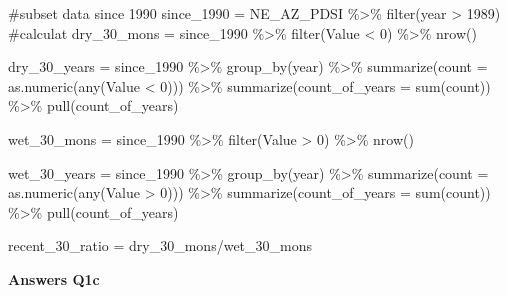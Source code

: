 \documentclass[
  letterpaper,
  DIV=11,
  numbers=noendperiod]{scrartcl}
\newenvironment{Shaded}{\begin{snugshade}}{\end{snugshade}}
\newcommand{\AttributeTok}[1]{\textcolor[rgb]{0.40,0.45,0.13}{#1}}
\newcommand{\CommentTok}[1]{\textcolor[rgb]{0.37,0.37,0.37}{#1}}
\newcommand{\DecValTok}[1]{\textcolor[rgb]{0.68,0.00,0.00}{#1}}
\newcommand{\FunctionTok}[1]{\textcolor[rgb]{0.28,0.35,0.67}{#1}}
\newcommand{\NormalTok}[1]{\textcolor[rgb]{0.00,0.23,0.31}{#1}}
\newcommand{\OtherTok}[1]{\textcolor[rgb]{0.00,0.23,0.31}{#1}}
\newcommand{\SpecialCharTok}[1]{\textcolor[rgb]{0.37,0.37,0.37}{#1}}
\begin{document}
\begin{Shaded}
\begin{Highlighting}[]
\CommentTok{\#subset data since 1990}
\NormalTok{since\_1990 }\OtherTok{=}\NormalTok{ NE\_AZ\_PDSI }\SpecialCharTok{\%\textgreater{}\%} 
  \FunctionTok{filter}\NormalTok{(year }\SpecialCharTok{\textgreater{}} \DecValTok{1989}\NormalTok{) }
\CommentTok{\#calculat}
\NormalTok{dry\_30\_mons }\OtherTok{=}\NormalTok{ since\_1990 }\SpecialCharTok{\%\textgreater{}\%} 
  \FunctionTok{filter}\NormalTok{(Value }\SpecialCharTok{\textless{}} \DecValTok{0}\NormalTok{) }\SpecialCharTok{\%\textgreater{}\%} 
  \FunctionTok{nrow}\NormalTok{()}

\NormalTok{dry\_30\_years }\OtherTok{=}\NormalTok{ since\_1990 }\SpecialCharTok{\%\textgreater{}\%} 
  \FunctionTok{group\_by}\NormalTok{(year) }\SpecialCharTok{\%\textgreater{}\%}
  \FunctionTok{summarize}\NormalTok{(}\AttributeTok{count =} \FunctionTok{as.numeric}\NormalTok{(}\FunctionTok{any}\NormalTok{(Value }\SpecialCharTok{\textless{}} \DecValTok{0}\NormalTok{))) }\SpecialCharTok{\%\textgreater{}\%}
  \FunctionTok{summarize}\NormalTok{(}\AttributeTok{count\_of\_years =} \FunctionTok{sum}\NormalTok{(count)) }\SpecialCharTok{\%\textgreater{}\%} 
  \FunctionTok{pull}\NormalTok{(count\_of\_years)}

\NormalTok{wet\_30\_mons }\OtherTok{=}\NormalTok{ since\_1990 }\SpecialCharTok{\%\textgreater{}\%} 
  \FunctionTok{filter}\NormalTok{(Value }\SpecialCharTok{\textgreater{}} \DecValTok{0}\NormalTok{) }\SpecialCharTok{\%\textgreater{}\%} 
  \FunctionTok{nrow}\NormalTok{()}

\NormalTok{wet\_30\_years }\OtherTok{=}\NormalTok{ since\_1990 }\SpecialCharTok{\%\textgreater{}\%} 
  \FunctionTok{group\_by}\NormalTok{(year) }\SpecialCharTok{\%\textgreater{}\%}
  \FunctionTok{summarize}\NormalTok{(}\AttributeTok{count =} \FunctionTok{as.numeric}\NormalTok{(}\FunctionTok{any}\NormalTok{(Value }\SpecialCharTok{\textgreater{}} \DecValTok{0}\NormalTok{))) }\SpecialCharTok{\%\textgreater{}\%}
  \FunctionTok{summarize}\NormalTok{(}\AttributeTok{count\_of\_years =} \FunctionTok{sum}\NormalTok{(count)) }\SpecialCharTok{\%\textgreater{}\%} 
  \FunctionTok{pull}\NormalTok{(count\_of\_years)}

\NormalTok{recent\_30\_ratio }\OtherTok{=}\NormalTok{ dry\_30\_mons}\SpecialCharTok{/}\NormalTok{wet\_30\_mons}
\end{Highlighting}
\end{Shaded}

\textbf{Answers Q1c}
\end{document}
